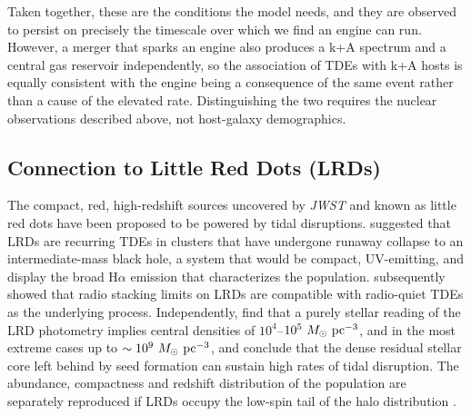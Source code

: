 \documentclass[preprint2]{aastex}
\newcommand{\msun}{M_{\odot}\xspace}
\begin{document}
Taken together, these are the conditions the model needs, and they are observed to persist on precisely the timescale over which we find an engine can run. However, a merger that sparks an engine also produces a k+A spectrum and a central gas reservoir independently, so the association of TDEs with k+A hosts is equally consistent with the engine being a consequence of the same event rather than a cause of the elevated rate. Distinguishing the two requires the nuclear observations described above, not host-galaxy demographics.

\subsection{Connection to Little Red Dots (LRDs)}\label{subsec:lrd}

The compact, red, high-redshift sources uncovered by {\it JWST} and known as little red dots have been proposed to be powered by tidal disruptions. \citet{Bellovary:2025a} suggested that LRDs are recurring TDEs in clusters that have undergone runaway collapse to an intermediate-mass black hole, a system that would be compact, UV-emitting, and display the broad H$\alpha$ emission that characterizes the population. \citet{Perger:2025a} subsequently showed that radio stacking limits on LRDs are compatible with radio-quiet TDEs as the underlying process. Independently, \citet{Pacucci:2025a} find that a purely stellar reading of the LRD photometry implies central densities of $10^{4}$--$10^{5}~\msun~{\rm pc}^{-3}$, and in the most extreme cases up to $\sim 10^{9}~\msun~{\rm pc}^{-3}$, and conclude that the dense residual stellar core left behind by seed formation can sustain high rates of tidal disruption. The abundance, compactness and redshift distribution of the population are separately reproduced if LRDs occupy the low-spin tail of the halo distribution \citep{Pacucci:2025b}.
\end{document}
